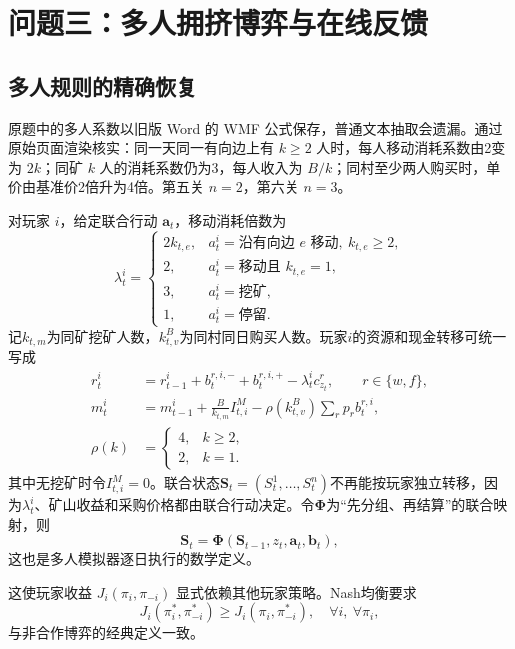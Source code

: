 \section{问题三：多人拥挤博弈与在线反馈}

\subsection{多人规则的精确恢复}

原题中的多人系数以旧版 Word 的 WMF 公式保存，普通文本抽取会遗漏。通过原始页面渲染核实：同一天同一有向边上有 $k\ge2$ 人时，每人移动消耗系数由2变为 $2k$；同矿 $k$ 人的消耗系数仍为3，每人收入为 $B/k$；同村至少两人购买时，单价由基准价2倍升为4倍。第五关 $n=2$，第六关 $n=3$。

对玩家 $i$，给定联合行动 $\bm a_t$，移动消耗倍数为
\begin{equation}
\lambda^i_t=
\begin{cases}
2k_{t,e},&a^i_t=\text{沿有向边 }e\text{ 移动},\ k_{t,e}\ge2,\\
2,&a^i_t=\text{移动且 }k_{t,e}=1,\\
3,&a^i_t=\text{挖矿},\\
1,&a^i_t=\text{停留}.
\end{cases}
\end{equation}
记$k_{t,m}$为同矿挖矿人数，$k_{t,v}^{B}$为同村同日购买人数。玩家$i$的资源和现金转移可统一写成
\begin{align}
r_t^i&=r_{t-1}^i+b_t^{r,i,-}+b_t^{r,i,+}
-\lambda_t^ic_{z_t}^r,\qquad r\in\{w,f\},
\label{eq:multi-resource}\\
m_t^i&=m_{t-1}^i+\frac{B}{k_{t,m}}I_{t,i}^{M}
-\rho(k_{t,v}^{B})\sum_{r}p_rb_t^{r,i},
\label{eq:multi-cash}\\
\rho(k)&=
\begin{cases}4,&k\ge2,\\2,&k=1.\end{cases}
\label{eq:village-congestion}
\end{align}
其中无挖矿时令$I_{t,i}^{M}=0$。联合状态$\bm S_t=(S_t^1,\ldots,S_t^n)$不再能按玩家独立转移，因为$\lambda_t^i$、矿山收益和采购价格都由联合行动决定。令$\bm\Phi$为“先分组、再结算”的联合映射，则
\begin{equation}
\bm S_t=\bm\Phi(\bm S_{t-1},z_t,\bm a_t,\bm b_t),
\label{eq:joint-transition}
\end{equation}
这也是多人模拟器逐日执行的数学定义。

这使玩家收益 $J_i(\pi_i,\pi_{-i})$ 显式依赖其他玩家策略。Nash均衡要求
\begin{equation}
J_i(\pi_i^*,\pi_{-i}^*)\ge J_i(\pi_i,\pi_{-i}^*),\quad
\forall i,\ \forall\pi_i,
\label{eq:nash}
\end{equation}
与非合作博弈的经典定义一致\cite{nash1951}。

